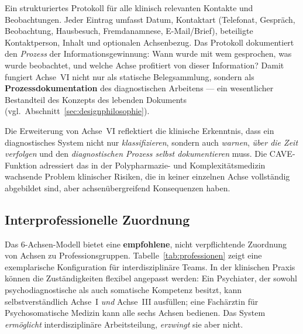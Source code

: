 \documentclass[11pt,a4paper]{article}
\begin{document}
\begin{description}[style=nextline, leftmargin=1.5cm, font=\bfseries]
\item[Kontakt- und Beobachtungsprotokoll] Ein strukturiertes Protokoll f\"ur alle klinisch relevanten Kontakte und Beobachtungen. Jeder Eintrag umfasst Datum, Kontaktart (Telefonat, Gespr\"ach, Beobachtung, Hausbesuch, Fremdanamnese, E-Mail/Brief), beteiligte Kontaktperson, Inhalt und optionalen Achsenbezug. Das Protokoll dokumentiert den \textit{Prozess} der Informationsgewinnung: Wann wurde mit wem gesprochen, was wurde beobachtet, und welche Achse profitiert von dieser Information? Damit fungiert Achse~VI nicht nur als statische Belegsammlung, sondern als \textbf{Prozessdokumentation} des diagnostischen Arbeitens --- ein wesentlicher Bestandteil des Konzepts des lebenden Dokuments (vgl.\ Abschnitt~\ref{sec:designphilosophie}).
\end{description}

Die Erweiterung von Achse~VI reflektiert die klinische Erkenntnis, dass ein diagnostisches System nicht nur \textit{klassifizieren}, sondern auch \textit{warnen}, \textit{\"uber die Zeit verfolgen} und den \textit{diagnostischen Prozess selbst dokumentieren} muss. Die CAVE-Funktion adressiert das in der Polypharmazie- und Komplexit\"atsmedizin wachsende Problem klinischer Risiken, die in keiner einzelnen Achse vollst\"andig abgebildet sind, aber achsen\"ubergreifend Konsequenzen haben.

\subsection{Interprofessionelle Zuordnung}
\label{sec:multiprofessionell}

Das 6-Achsen-Modell bietet eine \textbf{empfohlene}, nicht verpflichtende Zuordnung von Achsen zu Professionsgruppen. Tabelle~\ref{tab:professionen} zeigt eine exemplarische Konfiguration f\"ur interdisziplin\"are Teams. In der klinischen Praxis k\"onnen die Zust\"andigkeiten flexibel angepasst werden: Ein Psychiater, der sowohl psychodiagnostische als auch somatische Kompetenz besitzt, kann selbstverst\"andlich Achse~I \textit{und} Achse~III ausf\"ullen; eine Fach\"arztin f\"ur Psychosomatische Medizin kann alle sechs Achsen bedienen. Das System \textit{erm\"oglicht} interdisziplin\"are Arbeitsteilung, \textit{erzwingt} sie aber nicht.
\end{document}
